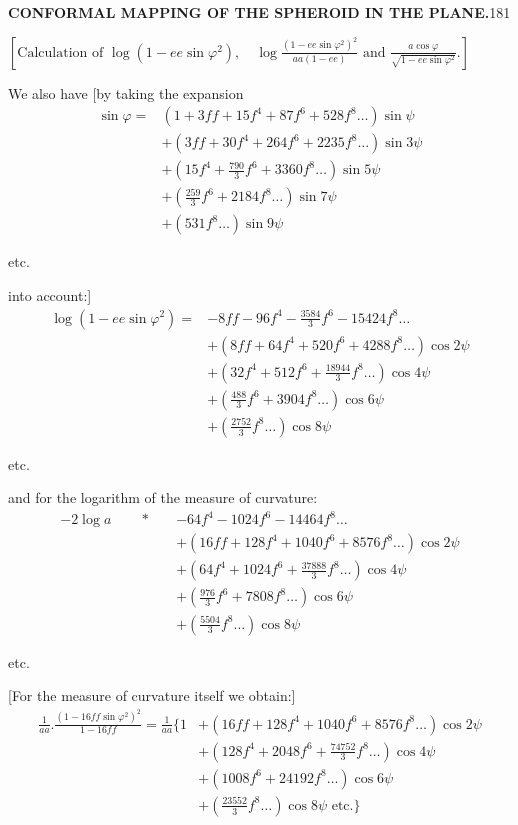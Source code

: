 \par\clearpage
\noindent\null\hfill{\small\textbf{CONFORMAL MAPPING OF THE SPHEROID IN THE PLANE.}}\hfill181\par\medskip
{\centering [27.]\par\medskip
\(\left[\text{Calculation of }\log(1-ee\sin\varphi^2),\quad
\log\frac{(1-ee\sin\varphi^2)^2}{aa(1-ee)}\text{ and }\frac{a\cos\varphi}{\sqrt{1-ee\sin\varphi^2}}.\right]\)\par}
We also have [by taking the expansion
\[
\begin{aligned}
\sin\varphi={}&(1+3ff+15f^4+87f^6+528f^8\ldots)\sin\psi\\
&+(3ff+30f^4+264f^6+2235f^8\ldots)\sin3\psi\\
&+(15f^4+\tfrac{790}{3}f^6+3360f^8\ldots)\sin5\psi\\
&+(\tfrac{259}{3}f^6+2184f^8\ldots)\sin7\psi\\
&+(531f^8\ldots)\sin9\psi
\end{aligned}
\]
{\centering etc.\par}
\noindent into account:]
\[
\begin{aligned}
\log(1-ee\sin\varphi^2)={}&-8ff-96f^4-\tfrac{3584}{3}f^6-15424f^8\ldots\\
&+(8ff+64f^4+520f^6+4288f^8\ldots)\cos2\psi\\
&+(32f^4+512f^6+\tfrac{18944}{3}f^8\ldots)\cos4\psi\\
&+(\tfrac{488}{3}f^6+3904f^8\ldots)\cos6\psi\\
&+(\tfrac{2752}{3}f^8\ldots)\cos8\psi
\end{aligned}
\]
{\centering etc.\par}
\noindent and for the logarithm of the measure of curvature:
\[
\begin{aligned}
-2\log a\qquad\ast\quad&-64f^4-1024f^6-14464f^8\ldots\\
&+(16ff+128f^4+1040f^6+8576f^8\ldots)\cos2\psi\\
&+(64f^4+1024f^6+\tfrac{37888}{3}f^8\ldots)\cos4\psi\\
&+(\tfrac{976}{3}f^6+7808f^8\ldots)\cos6\psi\\
&+(\tfrac{5504}{3}f^8\ldots)\cos8\psi
\end{aligned}
\]
{\centering etc.\par}
[For the measure of curvature itself we obtain:]
\[
\begin{aligned}
\frac1{aa}.\frac{(1-16ff\sin\varphi^2)^2}{1-16ff}=\frac1{aa}\biggl\{1&+(16ff+128f^4+1040f^6+8576f^8\ldots)\cos2\psi\\
&+(128f^4+2048f^6+\tfrac{74752}{3}f^8\ldots)\cos4\psi\\
&+(1008f^6+24192f^8\ldots)\cos6\psi\\
&+(\tfrac{23552}{3}f^8\ldots)\cos8\psi\text{ etc.}\biggr\}
\end{aligned}
\]

